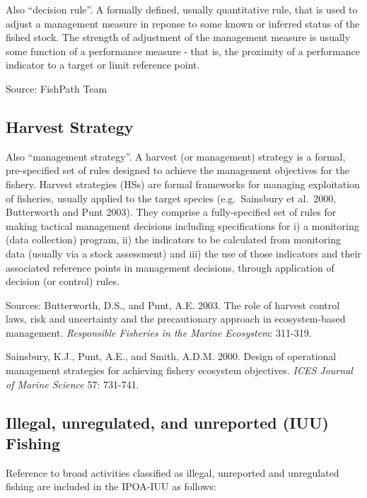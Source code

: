 \documentclass[
  11pt,
]{book}
\begin{document}
Also ``decision rule''. A formally defined, usually quantitative rule, that is used to adjust a management measure in reponse to some known or inferred status of the fished stock. The strength of adjustment of the management measure is usually some function of a performance measure - that is, the proximity of a performance indicator to a target or limit reference point.

Source: FishPath Team

\hypertarget{harvest-strategy}{%
\subsection{Harvest Strategy}\label{harvest-strategy}}

Also ``management strategy''. A harvest (or management) strategy is a formal, pre-specified set of rules designed to achieve the management objectives for the fishery. Harvest strategies (HSs) are formal frameworks for managing exploitation of fisheries, usually applied to the target species (e.g.~Sainsbury et al.~2000, Butterworth and Punt 2003). They comprise a fully-specified set of rules for making tactical management decisions including specifications for i) a monitoring (data collection) program, ii) the indicators to be calculated from monitoring data (usually via a stock assessment) and iii) the use of those indicators and their associated reference points in management decisions, through application of decision (or control) rules.

Sources: Butterworth, D.S., and Punt, A.E. 2003. The role of harvest control laws, risk and uncertainty and the precautionary approach in ecosystem-based management. \emph{Responsible Fisheries in the Marine Ecosystem}: 311-319.

Sainsbury, K.J., Punt, A.E., and Smith, A.D.M. 2000. Design of operational management strategies
for achieving fishery ecosystem objectives. \emph{ICES Journal of Marine Science} 57: 731-741.

\hypertarget{illegal-unregulated-and-unreported-iuu-fishing}{%
\subsection{Illegal, unregulated, and unreported (IUU) Fishing}\label{illegal-unregulated-and-unreported-iuu-fishing}}

Reference to broad activities classified as illegal, unreported and unregulated fishing are included in the IPOA-IUU as follows:
\end{document}

